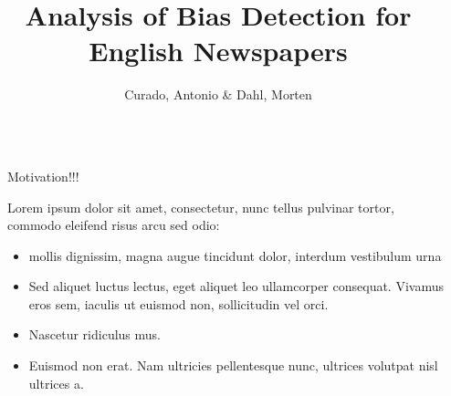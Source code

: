 \documentclass[final]{beamer}
\title{Analysis of Bias Detection for English Newspapers {\emoji[windows]{1F4F0}}} %
\author{Curado, Antonio \& Dahl, Morten} %
\institute{Masters in Advanced Analytics @ Nova IMS} %
\newlength{\sepwid}
\newlength{\onecolwid}
\begin{document}

\setlength{\belowcaptionskip}{2ex} %
\setlength\belowdisplayshortskip{2ex} %

\begin{frame}[t] %

\begin{columns}[t] %

\begin{column}{\sepwid}\end{column} %

\begin{column}{\onecolwid} %



\begin{block}{Motivation!!!}

    Lorem  ipsum dolor sit amet, consectetur, nunc tellus pulvinar tortor, commodo eleifend risus arcu sed odio:
    \begin{itemize}
    \item mollis dignissim, magna augue tincidunt dolor, interdum vestibulum urna
    \item Sed aliquet luctus lectus, eget aliquet leo ullamcorper consequat. Vivamus eros sem, iaculis ut euismod non, sollicitudin vel orci.
    \item Nascetur ridiculus mus.  
    \item Euismod non erat. Nam ultricies pellentesque nunc, ultrices volutpat nisl ultrices a.
    \end{itemize}

    \end{block}




\end{column}
\end{columns}
\end{frame}
\end{document}
